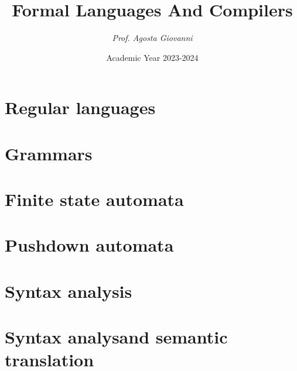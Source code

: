 \documentclass[12pt, a4paper]{report}
\title{\textbf{Formal Languages And Compilers}}
\author{\textit{Prof. Agosta Giovanni}}
\date{Academic Year 2023-2024}
\begin{document}
    \maketitle

    

    \cleardoublepage

    \tableofcontents

    \cleardoublepage

    \chapter{Regular languages}
    
    
    
    

    \chapter{Grammars}
    
    
    
    
    
    
    
    
    
    
    
    

    \chapter{Finite state automata}
    
    
    
    
    
    
    
    

    \chapter{Pushdown automata}
    
    

    \chapter{Syntax analysis}
    
    
    
    

    \chapter{Syntax analysand semantic translation}
    
    
    
    
\end{document}
